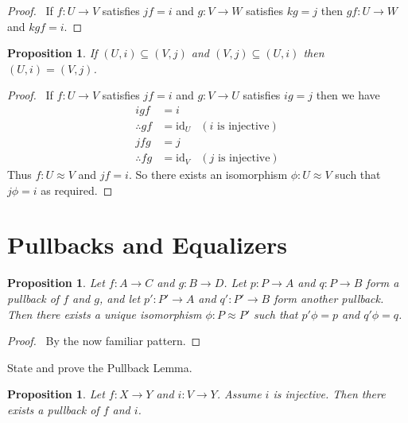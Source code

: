 \documentclass{book}
\let\qed\relax
\newtheorem{prop}[ax]{Proposition}
\theoremstyle{definition}
\newcommand{\id}[1]{\ensuremath{\mathrm{id}_{#1}}}
\begin{document}
\begin{proof}
\pf\ If $f : U \rightarrow V$ satisfies $jf=i$ and $g : V \rightarrow W$ satisfies $kg=j$ then $gf : U \rightarrow W$ and $kgf=i$. \qed
\end{proof}

\begin{prop}
If $(U,i) \subseteq (V,j)$ and $(V,j) \subseteq (U,i)$ then $(U,i) = (V,j)$.
\end{prop}

\begin{proof}
\pf\ If $f : U \rightarrow V$ satisfies $jf=i$ and $g : V \rightarrow U$ satisfies $ig=j$ then we have
\begin{align*}
igf & = i \\
\therefore gf & = \id{U} & (i \text{ is injective}) \\
jfg & = j \\
\therefore fg & = \id{V} & (j \text{ is injective})
\end{align*}
Thus $f : U \approx V$ and $jf = i$. So there exists an isomorphism $\phi : U \approx V$ such that $j \phi = i$ as required. \qed
\end{proof}

\section{Pullbacks and Equalizers}


\begin{prop}
Let $f : A \rightarrow C$ and $g : B \rightarrow D$. Let $p : P \rightarrow A$ and $q : P \rightarrow B$ form a pullback of $f$ and $g$, and let $p' : P' \rightarrow A$ and $q' : P' \rightarrow B$ form another pullback. Then there exists a unique isomorphism $\phi : P \approx P'$ such that $p' \phi = p$ and $q' \phi = q$.
\end{prop}

\begin{proof}
\pf\ By the now familiar pattern. \qed
\end{proof}

State and prove the Pullback Lemma.

\begin{prop}
Let $f : X \rightarrow Y$ and $i : V \rightarrow Y$. Assume $i$ is injective. Then there exists a pullback of $f$ and $i$.
\end{prop}
\end{document}
